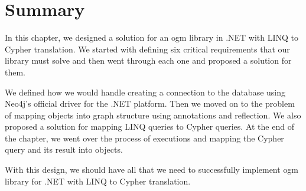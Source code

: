 \section{Summary}

In this chapter, we designed a solution for an \acrshort{ogm} library in .NET with LINQ to Cypher translation.
We started with defining six critical requirements that our library must solve and then went through each one and proposed a solution for them.

We defined how we would handle creating a connection to the database using Neo4j's official driver for the .NET platform.
Then we moved on to the problem of mapping objects into graph structure using annotations and reflection.
We also proposed a solution for mapping LINQ queries to Cypher queries.
At the end of the chapter, we went over the process of executions and mapping the Cypher query and its result into objects.

With this design, we should have all that we need to successfully implement \acrshort{ogm} library for .NET with LINQ to Cypher translation.
